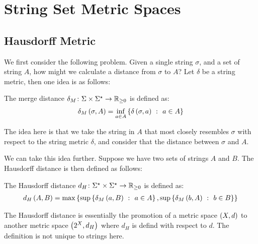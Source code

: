 \documentclass[12pt]{article}
\begin{document}
\section{String Set Metric Spaces}


\subsection{Hausdorff Metric}
We first consider the following problem.
Given a single string \(\sigma\), and a set of string \(A\),
how might we calculate a distance from \(\sigma\) to \(A\)?
Let \(\delta\) be a string metric, then one idea is as follows:

\begin{definition}
  The merge distance \(\delta_{M} \colon \Sigma \times \Sigma^\star \to \mathbb{R}_{\geq 0}\)
  is defined as:
  \begin{align*}
    \delta_M \left(\sigma, A\right)
      = \inf_{a \in A} \left\{\delta\left(\sigma, a\right) \ \colon\  a \in A\right\}
  \end{align*}
\end{definition}

The idea here is that we take the string in \(A\) that most closely
resembles \(\sigma\) with respect to the string metric \(\delta\),
and consider that the distance between \(\sigma\) and \(A\).

We can take this idea further.
Suppose we have two sets of strings \(A\) and \(B\).
The Hausdorff distance is then defined as follows:

\begin{definition}
  The Hausdorff distance
  \(d_H \colon \Sigma^\star \times \Sigma^\star \to \mathbb{R}_{\geq 0}\) is defined as:
  \begin{align*}
    d_H \left(A, B\right) =
      \max \left\{\sup \left\{\delta_{M} \left(a, B\right) \ \colon\  a \in A\right\},
                   \sup \left\{\delta_{M} \left(b, A\right) \ \colon\  b \in B\right\}\right\}
  \end{align*}
\end{definition}
The Hausdorff distance is essentially the promotion of a
metric space \(\left(X, d\right)\) to another metric space
\(\left(2^{X}, d_H\right)\) where \(d_H\) is defind with respect to \(d\).
The definition is not unique to strings here.


\pagebreak

\printbibliography
\end{document}
